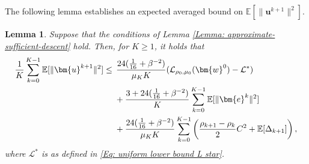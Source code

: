 \documentclass{article}
\theoremstyle{plain}
\newtheorem{lemma}{Lemma}[section]
\theoremstyle{definition}
\theoremstyle{remark}
\newcommand{\EE}{\mathbb{E}}
\newcommand{\be}{\bm{e}}
\newcommand{\bu}{\bm{u}}
\newcommand{\calL}{\mathcal{L}}
\newcommand{\bw}{\bm{w}}
\newcommand{\sumK}{\sum_{k=0}^{K-1}}
\numberwithin{equation}{section}
\begin{document}
The following lemma establishes an expected averaged bound on $\EE[\| \bu^{k+1}\|^{2}]$.
\begin{lemma}
    \label{Lemma: key u measure averaged in expectation} Suppose that
    the conditions of Lemma \ref{Lemma: approximate-sufficient-descent}
    hold. Then, for $K \geq 1$, it holds that
\begin{align}
        \label{Eq: the boundedness of subgradient-averaging}
        \frac{1}{K}\sumK \EE[\| \bu^{k+1}\|^{2}]
        \leq{} & \, \frac{24 ( \tfrac{1}{16} + \beta^{-2})}{\mu_{K}K}
        ( \calL_{\rho_0, \mu_0}(\bw^{0}) - \calL^{*}) \notag \\
        &+ \frac{3 + 24 ( \tfrac{1}{16} + \beta^{-2})}{K}
        \sumK \EE[\| \be^{k}\|^{2}]\notag \\
        &+ \frac{24 ( \tfrac{1}{16} + \beta^{-2})}{\mu_{K}K}
        \sumK \left( \frac{\rho_{k+1}- \rho_{k}}{2}C^{2}
        + \EE[\Delta_{k+1}] \right),
    \end{align}
    where $\calL^{*}$  is as defined in \eqref{Eq: uniform lower bound L star}.
\end{lemma}
\end{document}
